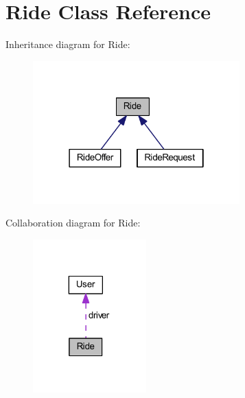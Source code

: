 \hypertarget{class_ride}{}\section{Ride Class Reference}
\label{class_ride}


Inheritance diagram for Ride\+:
\nopagebreak
\begin{figure}[H]
\begin{center}
\leavevmode
\includegraphics[width=226pt]{class_ride__inherit__graph}
\end{center}
\end{figure}


Collaboration diagram for Ride\+:
\nopagebreak
\begin{figure}[H]
\begin{center}
\leavevmode
\includegraphics[width=124pt]{class_ride__coll__graph}
\end{center}
\end{figure}
